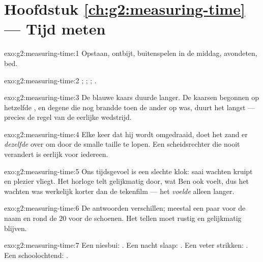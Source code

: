 \section*{Hoofdstuk \ref{ch:g2:measuring-time} --- Tijd meten}

\begin{solution}{exo:g2:measuring-time:1}
Opstaan, ontbijt, buitenspelen in de middag, avondeten, bed.
\end{solution}

\begin{solution}{exo:g2:measuring-time:2}
; ; ; .
\end{solution}

\begin{solution}{exo:g2:measuring-time:3}
De blauwe kaars duurde langer. De kaarsen begonnen op hetzelfde
, en degene die nog brandde toen de ander op was, duurt het
langst --- precies de regel van de eerlijke wedstrijd.
\end{solution}

\begin{solution}{exo:g2:measuring-time:4}
Elke keer dat hij wordt omgedraaid, doet het zand er \emph{dezelfde}
 over om door de smalle taille te lopen. Een
scheidsrechter die nooit verandert is eerlijk voor iedereen.
\end{solution}

\begin{solution}{exo:g2:measuring-time:5}
Ons tijdsgevoel is een slechte klok: saai wachten kruipt en plezier
vliegt. Het horloge telt gelijkmatig door, wat Ben ook voelt, dus het
wachten was werkelijk korter dan de tekenfilm --- het \emph{voelde}
alleen langer.
\end{solution}

\begin{solution}{exo:g2:measuring-time:6}
De antwoorden verschillen; meestal een paar  voor de naam en
rond de $20$  voor de schoenen. Het tellen moet rustig en
gelijkmatig blijven.
\end{solution}

\begin{solution}{exo:g2:measuring-time:7}
Een niesbui: . Een nacht slaap: . Een veter strikken:
. Een schoolochtend: .
\end{solution}

